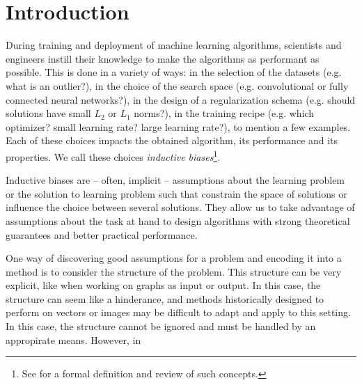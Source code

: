 
\section{Introduction}



During training and deployment of machine learning algorithms, scientists and engineers instill their knowledge to make the algorithms as performant as possible. This is done in a variety of ways: in the selection of the datasets (e.g. what is an outlier?), in the choice of the search space (e.g. convolutional or fully connected neural networks?), in the design of a regularization schema (e.g. should solutions have small $L_2$ or $L_1$ norms?), in the training recipe (e.g. which optimizer? small learning rate? large learning rate?), to mention a few examples. Each of these choices impacts the obtained algorithm, its performance and its properties. We call these choices \emph{inductive biases}\footnote{See \cite{mitchell-inductive,1806.01261} for a formal definition and review of such concepts.}.

Inductive biases are -- often, implicit -- assumptions about the learning problem or the solution to learning problem such that constrain the space of solutions or influence the choice between several solutions. They allow us to take advantage of assumptions about the task at hand to design algorithms with strong theoretical guarantees and better practical performance.

One way of discovering good assumptions for a problem and encoding it into a method is to consider the structure of the problem. This structure can be very explicit, like when working on graphs as input or output. In this case, the structure can seem like a hinderance, and methods historically designed to perform on vectors or images may be difficult to adapt and apply to this setting. In this case, the structure cannot be ignored and must be handled by an appropirate means. However, in







